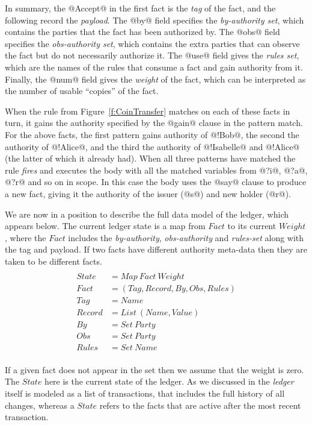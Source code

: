 In summary, the @Accept@ in the first fact is the \emph{tag} of the fact, and the following record the \emph{payload}. The @by@ field specifies the \emph{by-authority set}, which contains the parties that the fact has been authorized by. The @obs@ field specifies the \emph{obs-authority set}, which contains the extra parties that can observe the fact but do not necessarily authorize it. The @use@ field gives the \emph{rules set}, which are the names of the rules that consume a fact and gain authority from it. Finally, the @num@ field gives the \emph{weight} of the fact, which can be interpreted as the number of usable ``copies'' of the fact.

When the rule from Figure~\ref{f:CoinTransfer} matches on each of these facts in turn, it gains the authority specified by the @gain@ clause in the pattern match. For the above facts, the first pattern gains authority of @!Bob@, the second the authority of @!Alice@, and the third the authority of @!Isabelle@ and @!Alice@ (the latter of which it already had). When all three patterns have matched the rule \emph{fires} and executes the body with all the matched variables from @?i@, @?a@, @?r@ and so on in scope. In this case the body uses the @say@ clause to produce a new fact, giving it the authority of the issuer (@s@) and new holder (@r@).

We are now in a position to describe the full data model of the ledger, which appears below. The current ledger state is a map from $Fact$ to its current $Weight$, where the $Fact$ includes the \emph{by-authority}, \emph{obs-authority} and \emph{rules-set} along with the tag and payload. If two facts have different authority meta-data then they are taken to be different facts.
$$
\begin{array}{ll}
\\ State   & = Map~ Fact~ Weight
\\ Fact    & = (Tag, Record, By, Obs, Rules)
\\ Tag     & = Name
\\ Record  & = List~ (Name, Value)
\\ By      & = Set~ Party
\\ Obs     & = Set~ Party
\\ Rules   & = Set~ Name
\\[1ex]

\end{array}
$$

If a given fact does not appear in the set then we assume that the weight is zero. The $State$ here is the current state of the ledger. As we discussed in \REF the \emph{ledger} itself is modeled as a list of transactions, that includes the full history of all changes, whereas a $State$ refers to the facts that are active after the most recent transaction.

